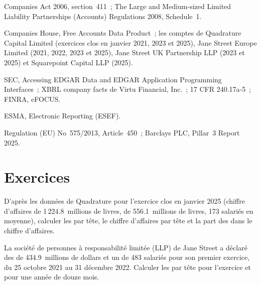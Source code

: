 \begin{omsources}
\item Companies Act 2006, section~411~; The Large and Medium-sized Limited Liability Partnerships (Accounts)
Regulations 2008, Schedule~1.
\item Companies House, Free Accounts Data Product~; les comptes de Quadrature Capital Limited (exercices clos en janvier 2021,
2023 et 2025), Jane Street Europe Limited (2021, 2022, 2023 et 2025), Jane Street UK Partnership LLP (2023 et 2025)
et Squarepoint Capital LLP (2025).
\item SEC, Accessing EDGAR Data and EDGAR Application Programming Interfaces~; XBRL company facts de Virtu Financial,
Inc.~; 17 CFR 240.17a-5~; FINRA, eFOCUS.
\item ESMA, Electronic Reporting (ESEF).
\item Regulation (EU) No~575/2013, Article~450~; Barclays PLC, Pillar~3 Report 2025.
\end{omsources}

\section{Exercices}

\begin{exercise}[$\star$]\label{exo:in:reading-a-trading-firms-accounts:1}
D'après les données de Quadrature pour l'exercice clos en janvier 2025 (chiffre d'affaires de 1\,224.8~millions de livres, 
de 556.1~millions de livres, 173 salariés en moyenne), calculer les  par tête, le chiffre d'affaires par tête et la part des  dans
le chiffre d'affaires.
\end{exercise}

\begin{exercise}[$\star$]\label{exo:in:reading-a-trading-firms-accounts:2}
La société de personnes à responsabilité limitée (LLP) de Jane Street a déclaré des  de 434.9~millions de dollars et un  de 483 salariés pour son premier
exercice, du 25 octobre 2021 au 31 décembre 2022. Calculer les  par tête pour l'exercice et pour une année de douze mois.
\end{exercise}

